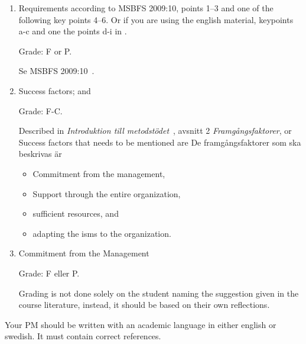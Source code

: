 \documentclass[a4paper]{llncs}
\begin{document}
\begin{enumerate}
  \item Requirements according to MSBFS 2009:10, points 1--3 and one of the
    following key points 4--6. Or if you are using the english material,
    keypoints a-c and one the points d-i in \cite[chap. 3.2.1]{iso27000}.
    \begin{solution}
      Grade: F or P.

      Se MSBFS 2009:10~\cite{MSBFS2009:10}.
    \end{solution}

  \item Success factors; and
    \begin{solution}
      Grade: F-C.

      Described in \emph{Introduktion till metodstödet}~\cite{MSB2011itm}, avsnitt 
      2 \emph{Framgångsfaktorer}, or \cite[3.6]{iso27000}
      Success factors that needs to be mentioned are
      De framgångsfaktorer som ska beskrivas är
      \begin{itemize}
        \item Commitment from the management,
        \item Support through the entire organization,
        \item sufficient resources, and
        \item adapting the \ac{isms} to the organization.
      \end{itemize}
    \end{solution}

  \item Commitment from the Management
    \begin{solution}
      Grade: F eller P.
      
      Grading is not done solely on the student naming the suggestion given in
      the course literature, instead, it should be based on their own
      reflections.
    \end{solution}
\end{enumerate}

Your PM should be written with an academic language in either english or
swedish. It must contain correct references.

\printbibliography{}
\end{document}
